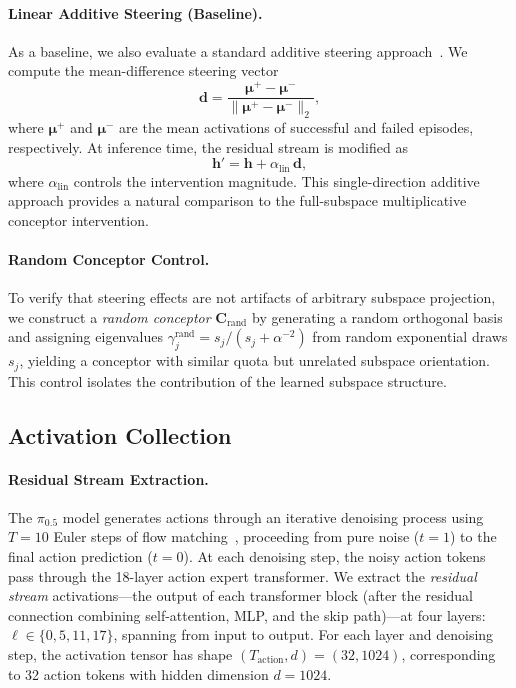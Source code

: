 \paragraph{Linear Additive Steering (Baseline).}
As a baseline, we also evaluate a standard additive steering approach~\citep{turner2023activation,li2024inference}. We compute the mean-difference steering vector
\begin{equation}
    \mathbf{d} = \frac{\boldsymbol{\mu}^{+} - \boldsymbol{\mu}^{-}}{\| \boldsymbol{\mu}^{+} - \boldsymbol{\mu}^{-} \|_2},
    \label{eq:linear_direction}
\end{equation}
where $\boldsymbol{\mu}^{+}$ and $\boldsymbol{\mu}^{-}$ are the mean activations of successful and failed episodes, respectively. At inference time, the residual stream is modified as
\begin{equation}
    \mathbf{h}' = \mathbf{h} + \alpha_{\text{lin}}\, \mathbf{d},
    \label{eq:linear_steer}
\end{equation}
where $\alpha_{\text{lin}}$ controls the intervention magnitude. This single-direction additive approach provides a natural comparison to the full-subspace multiplicative conceptor intervention.

\paragraph{Random Conceptor Control.}
To verify that steering effects are not artifacts of arbitrary subspace projection, we construct a \emph{random conceptor} $\mathbf{C}_{\text{rand}}$ by generating a random orthogonal basis and assigning eigenvalues $\gamma_j^{\text{rand}} = s_j / (s_j + \alpha^{-2})$ from random exponential draws $s_j$, yielding a conceptor with similar quota but unrelated subspace orientation. This control isolates the contribution of the learned subspace structure.


\subsection{Activation Collection}
\label{sec:activations}

\paragraph{Residual Stream Extraction.}
The $\pi_{0.5}$\xspace model generates actions through an iterative denoising process using $T = 10$ Euler steps of flow matching~\citep{lipman2023flow}, proceeding from pure noise ($t=1$) to the final action prediction ($t=0$). At each denoising step, the noisy action tokens pass through the 18-layer action expert transformer. We extract the \emph{residual stream} activations---the output of each transformer block (after the residual connection combining self-attention, MLP, and the skip path)---at four layers: $\ell \in \{0, 5, 11, 17\}$, spanning from input to output. For each layer and denoising step, the activation tensor has shape $(T_{\text{action}}, d) = (32, 1024)$, corresponding to 32 action tokens with hidden dimension $d = 1024$.

